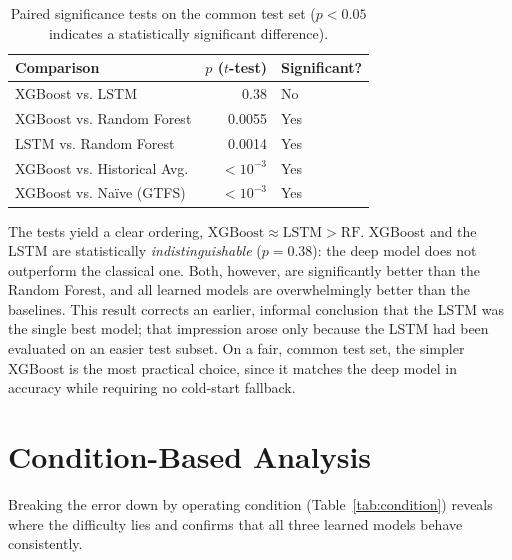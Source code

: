 \begin{table}[!htbp]
    \centering
    \caption{\label{tab:sig}Paired significance tests on the common test set ($p<0.05$ indicates a statistically significant difference).}
    \begin{tabular}{@{}lrl@{}}
        \toprule
        \textbf{Comparison} & \textbf{$p$ ($t$-test)} & \textbf{Significant?} \\
        \midrule
        XGBoost vs. LSTM            & 0.38   & No \\
        XGBoost vs. Random Forest   & 0.0055 & Yes \\
        LSTM vs. Random Forest      & 0.0014 & Yes \\
        XGBoost vs. Historical Avg. & $<10^{-3}$ & Yes \\
        XGBoost vs. Naïve (GTFS)    & $<10^{-3}$ & Yes \\
        \bottomrule
    \end{tabular}
\end{table}

The tests yield a clear ordering, $\text{XGBoost} \approx \text{LSTM} > \text{RF}$. XGBoost and the LSTM are statistically \emph{indistinguishable} ($p=0.38$): the deep model does not outperform the classical one. Both, however, are significantly better than the Random Forest, and all learned models are overwhelmingly better than the baselines. This result corrects an earlier, informal conclusion that the LSTM was the single best model; that impression arose only because the LSTM had been evaluated on an easier test subset. On a fair, common test set, the simpler XGBoost is the most practical choice, since it matches the deep model in accuracy while requiring no cold-start fallback.

\section{Condition-Based Analysis}

Breaking the error down by operating condition (Table~\ref{tab:condition}) reveals where the difficulty lies and confirms that all three learned models behave consistently.


